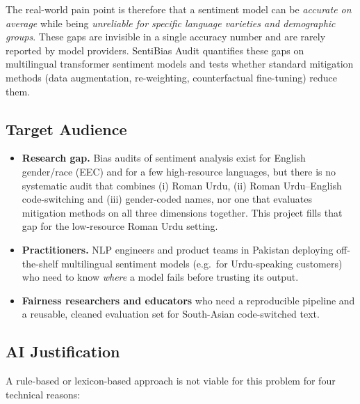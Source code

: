 \documentclass[11pt,a4paper]{article}
\begin{document}
The real-world pain point is therefore that a sentiment model can be \emph{accurate on average}
while being \emph{unreliable for specific language varieties and demographic groups}. These gaps
are invisible in a single accuracy number and are rarely reported by model providers. SentiBias
Audit quantifies these gaps on multilingual transformer sentiment models and tests whether
standard mitigation methods (data augmentation, re-weighting, counterfactual fine-tuning) reduce
them.

\subsection{Target Audience}
\begin{itemize}
  \item \textbf{Research gap.} Bias audits of sentiment analysis exist for English gender/race
        (EEC) and for a few high-resource languages, but there is no systematic audit that
        combines (i) Roman Urdu, (ii) Roman Urdu--English code-switching and (iii) gender-coded
        names, nor one that evaluates mitigation methods on all three dimensions together. This
        project fills that gap for the low-resource Roman Urdu setting.
  \item \textbf{Practitioners.} NLP engineers and product teams in Pakistan deploying off-the-shelf
        multilingual sentiment models (e.g.\ for Urdu-speaking customers) who need to know
        \emph{where} a model fails before trusting its output.
  \item \textbf{Fairness researchers and educators} who need a reproducible pipeline and a
        reusable, cleaned evaluation set for South-Asian code-switched text.
\end{itemize}

\subsection{AI Justification}
A rule-based or lexicon-based approach is not viable for this problem for four technical reasons:
\end{document}
